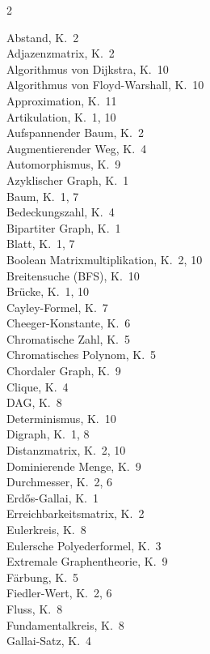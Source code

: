 ﻿\documentclass[a4paper,12pt,openany,oneside]{book}
\theoremstyle{definition}
\theoremstyle{plain}
\theoremstyle{remark}
\begin{document}
\begin{multicols}{2}
\small\raggedright
Abstand, K.~2 \\
Adjazenzmatrix, K.~2 \\
Algorithmus von Dijkstra, K.~10 \\
Algorithmus von Floyd-Warshall, K.~10 \\
Approximation, K.~11 \\
Artikulation, K.~1, 10 \\
Aufspannender Baum, K.~2 \\
Augmentierender Weg, K.~4 \\
Automorphismus, K.~9 \\
Azyklischer Graph, K.~1 \\
Baum, K.~1, 7 \\
Bedeckungszahl, K.~4 \\
Bipartiter Graph, K.~1 \\
Blatt, K.~1, 7 \\
Boolean Matrixmultiplikation, K.~2, 10 \\
Breitensuche (BFS), K.~10 \\
Br\"ucke, K.~1, 10 \\
Cayley-Formel, K.~7 \\
Cheeger-Konstante, K.~6 \\
Chromatische Zahl, K.~5 \\
Chromatisches Polynom, K.~5 \\
Chordaler Graph, K.~9 \\
Clique, K.~4 \\
DAG, K.~8 \\
Determinismus, K.~10 \\
Digraph, K.~1, 8 \\
Distanzmatrix, K.~2, 10 \\
Dominierende Menge, K.~9 \\
Durchmesser, K.~2, 6 \\
Erd\H{o}s-Gallai, K.~1 \\
Erreichbarkeitsmatrix, K.~2 \\
Eulerkreis, K.~8 \\
Eulersche Polyederformel, K.~3 \\
Extremale Graphentheorie, K.~9 \\
F\"arbung, K.~5 \\
Fiedler-Wert, K.~2, 6 \\
Fluss, K.~8 \\
Fundamentalkreis, K.~8 \\
Gallai-Satz, K.~4 \\

\end{multicols}
\end{document}
